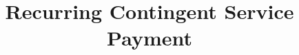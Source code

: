 \documentclass[orivec]{llncs}
\begin{document}
  \setlength\abovedisplayskip{0pt}
  \setlength\belowdisplayskip{0pt}


\newenvironment{packed_item}{
\begin{itemize}
	\setlength{\topsep}{0pt}
	\setlength{\partopsep}{0pt}
  \setlength{\itemsep}{0pt}
  \setlength{\parskip}{0pt}
  \setlength{\parsep}{0pt}
}{\end{itemize}}

\newenvironment{packed_enum}{
\begin{enumerate}
	\setlength{\topsep}{0pt}
	\setlength{\partopsep}{0pt}
  \setlength{\itemsep}{0pt}
  \setlength{\parskip}{0pt}
  \setlength{\parsep}{0pt}
}{\end{enumerate}}





\title{Recurring Contingent Service Payment}
%
%
\author{}
\institute{}


\maketitle              %
%
\begin{abstract}



\end{abstract}
 




\appendix

%


%
\end{document}
